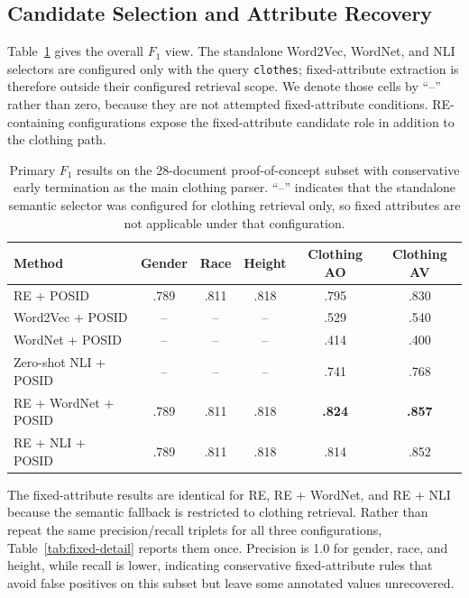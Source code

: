 \documentclass[sigconf,nonacm]{acmart}
\newcommand{\posid}{\textsc{POSID}}
\begin{document}
\subsection{Candidate Selection and Attribute Recovery}
\label{subsec:results-main}

Table~\ref{tab:main-results} gives the overall $F_1$ view.  The standalone
Word2Vec, WordNet, and NLI selectors are configured only with the query
\texttt{clothes}; fixed-attribute extraction is therefore outside their
configured retrieval scope.  We denote those cells by ``--'' rather than zero,
because they are not attempted fixed-attribute conditions.  RE-containing
configurations expose the fixed-attribute candidate role in addition to the
clothing path.

\begin{table}[t]
    \centering
    \caption{Primary $F_1$ results on the 28-document proof-of-concept subset
    with conservative early termination as the main clothing parser.  ``--''
    indicates that the standalone semantic selector was configured for
    clothing retrieval only, so fixed attributes are not applicable under that
    configuration.}
    \label{tab:main-results}
    \small
    \setlength{\tabcolsep}{8pt}
    \begin{tabular}{lccccc}
        \toprule
        Method & Gender & Race & Height & Clothing AO & Clothing AV \\
        \midrule
        RE + \posid{} & .789 & .811 & .818 & .795 & .830 \\
        Word2Vec + \posid{} & -- & -- & -- & .529 & .540 \\
        WordNet + \posid{} & -- & -- & -- & .414 & .400 \\
        Zero-shot NLI + \posid{} & -- & -- & -- & .741 & .768 \\
        RE + WordNet + \posid{} & .789 & .811 & .818 & \textbf{.824} & \textbf{.857} \\
        RE + NLI + \posid{} & .789 & .811 & .818 & .814 & .852 \\
        \bottomrule
    \end{tabular}
\end{table}

The fixed-attribute results are identical for RE, RE + WordNet, and RE + NLI
because the semantic fallback is restricted to clothing retrieval.  Rather than
repeat the same precision/recall triplets for all three configurations,
Table~\ref{tab:fixed-detail} reports them once.  Precision is 1.0 for gender,
race, and height, while recall is lower, indicating conservative fixed-attribute
rules that avoid false positives on this subset but leave some annotated values
unrecovered.
\end{document}
